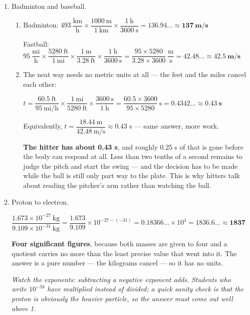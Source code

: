 \documentclass[12pt, twoside]{article}
\begin{document}
\begin{enumerate}[itemsep=0.25cm]
\item Badminton and baseball.
  \begin{enumerate}[itemsep=0.15cm]
    \item Badminton: $493~\dfrac{\text{km}}{\text{h}} \times \dfrac{1000~\text{m}}{1~\text{km}}
      \times \dfrac{1~\text{h}}{3600~\text{s}} = 136.94\ldots \approx \mathbf{137~\textbf{m/s}}$

      Fastball: $95~\dfrac{\text{mi}}{\text{h}} \times \dfrac{5280~\text{ft}}{1~\text{mi}}
      \times \dfrac{1~\text{m}}{3.28~\text{ft}} \times \dfrac{1~\text{h}}{3600~\text{s}}
      = \dfrac{95 \times 5280}{3.28 \times 3600}~\dfrac{\text{m}}{\text{s}}
      = 42.48\ldots \approx \mathbf{42.5~\textbf{m/s}}$
    \item The neat way needs no metric units at all --- the feet and the miles cancel
      each other:

      $t = \dfrac{60.5~\text{ft}}{95~\text{mi/h}} \times \dfrac{1~\text{mi}}{5280~\text{ft}}
      \times \dfrac{3600~\text{s}}{1~\text{h}}
      = \dfrac{60.5 \times 3600}{95 \times 5280}~\text{s} = 0.4342\ldots
      \approx \mathbf{0.43~\textbf{s}}$

      Equivalently, $t = \dfrac{18.44~\text{m}}{42.48~\text{m/s}} \approx 0.43$ s --- same
      answer, more work.

      \textbf{The hitter has about 0.43 s}, and roughly 0.25 s of that is gone before the
      body can respond at all. Less than two tenths of a second remains to judge the pitch
      and start the swing --- and the decision has to be made while the ball is still only
      part way to the plate. This is why hitters talk about reading the pitcher's arm
      rather than watching the ball.
  \end{enumerate}

\item Proton to electron.

  $\dfrac{1.673 \times 10^{-27}~\text{kg}}{9.109 \times 10^{-31}~\text{kg}}
  = \dfrac{1.673}{9.109} \times 10^{-27-(-31)} = 0.18366\ldots \times 10^{4}
  = 1836.6\ldots \approx \mathbf{1837}$

  \textbf{Four significant figures}, because both masses are given to four and a quotient
  carries no more than the least precise value that went into it. The answer is a pure
  number --- the kilograms cancel --- so it has no units.

  \emph{Watch the exponents: subtracting a negative exponent adds. Students who write
  $10^{-58}$ have multiplied instead of divided; a quick sanity check is that the proton is
  obviously the heavier particle, so the answer must come out well above 1.}


\end{enumerate}
\end{document}
